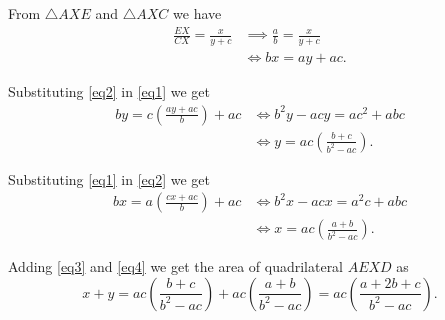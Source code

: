 \documentclass{article}
\begin{document}
From \( \triangle AXE \) and \( \triangle AXC \) we have
\begin{align}
\frac{EX}{CX} = \frac{x}{y + c}
& \implies \frac{a}{b} = \frac{x}{y + c} \nonumber \\
& \iff              bx = ay + ac. \label{eq2}
\end{align}

Substituting \eqref{eq2} in \eqref{eq1} we get
\begin{align}
by = c \left( \frac{ay + ac}{b} \right) + ac
& \iff b^2y - acy = ac^2 + abc \nonumber \\
& \iff y = ac \left( \frac{b + c}{b^2 - ac} \right). \label{eq3}
\end{align}

Substituting \eqref{eq1} in \eqref{eq2} we get
\begin{align}
bx = a \left( \frac{cx + ac}{b} \right) + ac
& \iff b^2x - acx = a^2c + abc \nonumber \\
& \iff x = ac \left( \frac{a + b}{b^2 - ac} \right). \label{eq4}
\end{align}

Adding \eqref{eq3} and \eqref{eq4} we get the area of quadrilateral \(
AEXD \) as
\[
x + y = ac \left( \frac{b + c}{b^2 - ac} \right) +
        ac \left( \frac{a + b}{b^2 - ac} \right)
      = ac \left( \frac{a + 2b + c}{b^2 - ac} \right).
\]
\end{document}
